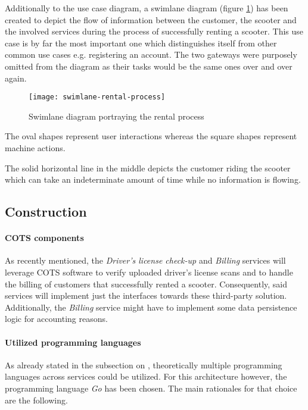 \documentclass[12pt,a4paper]{report}
\begin{document}
Additionally to the use case diagram, a swimlane diagram
(figure \ref{fig:swimlane-rental-process}) has been created to depict
the flow of information between the customer, the scooter and the
involved services during the process of successfully renting a scooter.
This use case is by far the most important one which distinguishes itself
from other common use cases e.g. registering an account.
The two gateways were purposely omitted from the diagram as their tasks would
be the same ones over and over again.

\begin{figure}[htbp]
\centering
\texttt{[image: swimlane-rental-process]}
\caption{Swimlane diagram portraying the rental process}
\label{fig:swimlane-rental-process}
\end{figure}

The oval shapes represent user interactions whereas the square shapes represent
machine actions.

The solid horizontal line in the middle depicts the customer riding the scooter
which can take an indeterminate amount of time while no information is flowing.


\subsection{Construction} \label{subsect:analysis-construction}

\paragraph{COTS components}
As recently mentioned, the \textit{Driver's license check-up} and \textit{Billing}
services will leverage COTS software to verify uploaded driver's license scans
and to handle the billing of customers that successfully rented a scooter.
Consequently, said services will implement just the interfaces towards these
third-party solution. Additionally, the \textit{Billing} service might have
to implement some data persistence logic for accounting reasons.

\paragraph{Utilized programming languages}
As already stated in the subsection on \textit{},
theoretically multiple programming languages across services could be utilized.
For this architecture however, the programming language \textit{Go} has been chosen.
The main rationales for that choice are the following.
\end{document}
